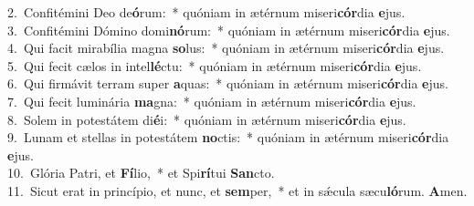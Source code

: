 {2.~}Confitémini Deo de\textbf{ó}rum:~* quóniam in ætérnum miseri\textbf{cór}dia \textbf{e}jus.\\
{3.~}Confitémini Dómino domi\textbf{nó}rum:~* quóniam in ætérnum miseri\textbf{cór}dia \textbf{e}jus.\\
{4.~}Qui facit mirabília magna \textbf{so}lus:~* quóniam in ætérnum miseri\textbf{cór}dia \textbf{e}jus.\\
{5.~}Qui fecit cælos in intel\textbf{lé}ctu:~* quóniam in ætérnum miseri\textbf{cór}dia \textbf{e}jus.\\
{6.~}Qui firmávit terram super \textbf{a}quas:~* quóniam in ætérnum miseri\textbf{cór}dia \textbf{e}jus.\\
{7.~}Qui fecit luminária \textbf{ma}gna:~* quóniam in ætérnum miseri\textbf{cór}dia \textbf{e}jus.\\
{8.~}Solem in potestátem di\textbf{é}i:~* quóniam in ætérnum miseri\textbf{cór}dia \textbf{e}jus.\\
{9.~}Lunam et stellas in potestátem \textbf{no}ctis:~* quóniam in ætérnum miseri\textbf{cór}dia \textbf{e}jus.\\
{10.~}Glória Patri, et \textbf{Fí}lio,~* et Spi\textbf{rí}tui \textbf{San}cto.\\
{11.~}Sicut erat in princípio, et nunc, et \textbf{sem}per,~* et in sǽcula sæcu\textbf{ló}rum. \textbf{A}men.\\
